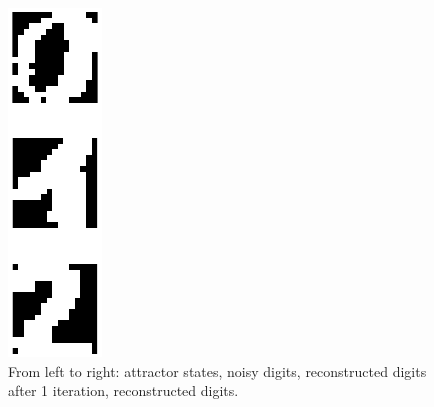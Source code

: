 \documentclass[10pt,a4paper]{article}
\begin{document}
\begin{figure}[htb]
\begin{minipage}{0.08\textwidth}
\end{minipage}%
\begin{minipage}{0.08\textwidth}
\includegraphics[width=\textwidth]{figs/reconstructed.png}
\end{minipage}%
\caption{From left to right: attractor states, noisy digits, reconstructed digits after 1 iteration, reconstructed digits.}
\end{figure}
\end{document}
